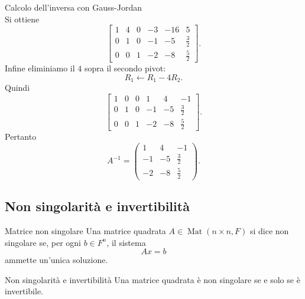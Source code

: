 \documentclass[a4paper]{article}
\begin{document}
\begin{snippetexample}{Calcolo dell'inversa con Gauss-Jordan}
\[    \]
    Si ottiene
    \[
        \left[
            \begin{array}{ccc|ccc}
                1 & 4 & 0 & -3 & -16 & 5\\
                0 & 1 & 0 & -1 & -5 & \frac{3}{2}\\
                0 & 0 & 1 & -2 & -8 & \frac{5}{2}
            \end{array}
        \right].
    \]
    Infine eliminiamo il \(4\) sopra il secondo pivot:
    \[
        R_1\longleftarrow R_1-4R_2.
    \]
    Quindi
    \[
        \left[
            \begin{array}{ccc|ccc}
                1 & 0 & 0 & 1 & 4 & -1\\
                0 & 1 & 0 & -1 & -5 & \frac{3}{2}\\
                0 & 0 & 1 & -2 & -8 & \frac{5}{2}
            \end{array}
        \right].
    \]
    Pertanto
    \[
        A^{-1}=
        \begin{pmatrix}
            1 & 4 & -1\\
            -1 & -5 & \frac{3}{2}\\
            -2 & -8 & \frac{5}{2}
        \end{pmatrix}.
    \]
\end{snippetexample}

\subsection{Non singolarità e invertibilità}

\begin{snippetdefinition}{Matrice non singolare}
    Una matrice quadrata \(A\in\operatorname{Mat}(n\times n,F)\) si dice non singolare se, per ogni \(b\in F^n\), il sistema
    \[
        Ax=b
    \]
    ammette un'unica soluzione.
\end{snippetdefinition}

\begin{snippettheorem}{Non singolarità e invertibilità}
    Una matrice quadrata è non singolare se e solo se è invertibile.
\end{snippettheorem}
\end{document}
